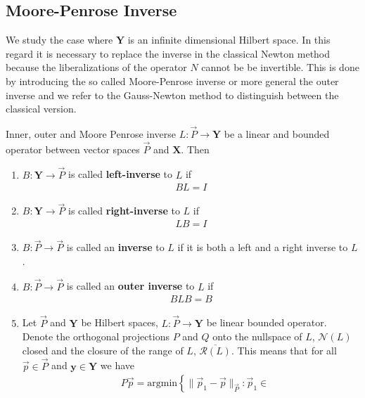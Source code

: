 \subsection{Moore-Penrose Inverse}
We study the case where $\mathbf{Y}$ is an infinite dimensional Hilbert
space. In this regard it is necessary to replace the inverse in the classical
Newton method because the liberalizations of the operator $N$ cannot be be
invertible. This is done by introducing the so called Moore-Penrose inverse
or more general the outer inverse and we refer to the Gauss-Newton method to
distinguish between the classical version.
\begin{mydef}{Inner, outer and Moore Penrose inverse \label{def:
    moore-penrose}}
    $L: \vec{P} \to \mathbf{Y}$ be a linear and bounded operator between
    vector spaces $\vec{P}$ and $\mathbf{X}$. Then
    \begin{enumerate}
        \item $B: \mathbf{Y} \to \vec{P}$ is called \textbf{left-inverse} to
            $L$ if
            \begin{align}
                BL = I
            \end{align}
        \item $B: \mathbf{Y} \to \vec{P}$ is called \textbf{right-inverse} to
            $L$ if
            \begin{align}
                LB = I
            \end{align}
        \item $B: \vec{P} \to \vec{P}$ is called an \textbf{inverse} to
            $L$ if it is both a left and a right inverse to $L$.
        \item $B: \vec{P} \to \vec{P}$ is called an \textbf{outer inverse} to
            $L$ if
            \begin{align}
                BLB = B
            \end{align}
        \item Let $\vec{P}$ and $\mathbf{Y}$ be Hilbert spaces, $L: \vec{P}
            \to \mathbf{Y}$ be linear bounded operator. Denote the
            orthogonal projections $P$ and $Q$ onto the nullspace of $L$,
            $\mathcal{N}(L)$ closed and the closure of the range of $L$,
            $\overline{\mathcal{R}\left(L  \right)} $. This means that for all $\vec{p}
            \in \vec{P}$ and $\mathbf{y} \in \mathbf{Y}$ we have
            \begin{align}
                &P\vec{p} = \text{argmin}
                \left\{
                    \|\vec{p}_1-\vec{p}\|_{\vec{P}} : \vec{p}_1 \in

\end{align}
\end{enumerate}
\end{mydef}
